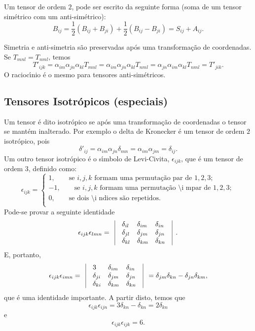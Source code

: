 Um tensor de
ordem $2$, pode ser escrito da seguinte forma (soma de um tensor
sim\'etrico com um anti-sim\'etrico):
\[B_{ij}=\frac{1}{2}(B_{ij}+B_{ji})+\frac{1}{2}(B_{ij}-B_{ji})=S_{ij}+A_{ij}.\]

Simetria e anti-simetria s\~ao preservadas ap\'os uma
transforma\c{c}\~ao de coordenadas.
 Se $T_{mnl}=T_{nml}$, temos
\[T'_{ijk}=\alpha_{im}\alpha_{jn}\alpha_{kl}T_{mnl}=\alpha_{im}\alpha_{jn}\alpha_{kl}T_{nml}=
\alpha_{jn}\alpha_{im}\alpha_{kl}T_{nml}=T'_{jik}.\] 
O racioc\'\i nio \'e o mesmo para tensores anti-sim\'etricos.

\subsection{Tensores Isotr\'opicos (especiais)}


Um tensor \'e dito isotr\'opico se ap\'os uma transforma\c{c}\~ao
de coordenadas o tensor se mant\'em inalterado.
Por exemplo o delta de Kronecker \'e um tensor de ordem $2$
isotr\'opico, pois
\[\delta'_{ij}=\alpha_{im}\alpha_{jn}\delta_{mn}=\alpha_{im}\alpha_{jm}=\delta_{ij}.\]
Um outro tensor isotr\'opico \'e o s\'\i mbolo de Levi-Civita,
$\epsilon_{ijk}$, que \'e um tensor de ordem $3$, definido como:
\[\epsilon_{ijk}=\left\{ \begin{array}{l}
           1,\mbox{   }\mbox{   }\mbox{   }\mbox{se $i,j,k$ formam uma
permuta\c{c}\~ao par de $1,2,3$};\\
          -1,\mbox{   }\mbox{   }\mbox{   }\mbox{se $i,j,k$ formam uma
permuta\c{c}\~ao \'\i mpar de $1,2,3$};\\
           0,\mbox{   }\mbox{   }\mbox{   }\mbox{se dois \'\i ndices s\~ao repetidos}.\\
\end{array} \right.\]
Pode-se provar a seguinte identidade
\[\epsilon_{ijk}\epsilon_{lmn}= \begin{array}{lllll}
                \vline & \delta_{il} & \delta_{im} & \delta_{in} & \vline\\
                \vline &\delta_{jl} & \delta_{jm} & \delta_{jn} &\vline\\
                 \vline &\delta_{kl} & \delta_{km} & \delta_{kn} &\vline\\
\end{array}.\]
E, portanto,
\[\epsilon_{ijk}\epsilon_{imn}= \begin{array}{lllll}
                \vline & 3 & \delta_{im} & \delta_{in}&\vline \\
                \vline & \delta_{ji} & \delta_{jm} & \delta_{jn}& \vline\\
               \vline & \delta_{ki} & \delta_{km} & \delta_{kn}& \vline\\
\end{array}=\delta_{jm}\delta_{kn}-\delta_{jn}\delta_{km},\]
que \'e uma identidade importante. A partir disto, temos que
\[\epsilon_{ijk}\epsilon_{ijn}=3\delta_{kn}-\delta_{kn}=2\delta_{kn}\]
e
\[\epsilon_{ijk}\epsilon_{ijk}=6.\]

